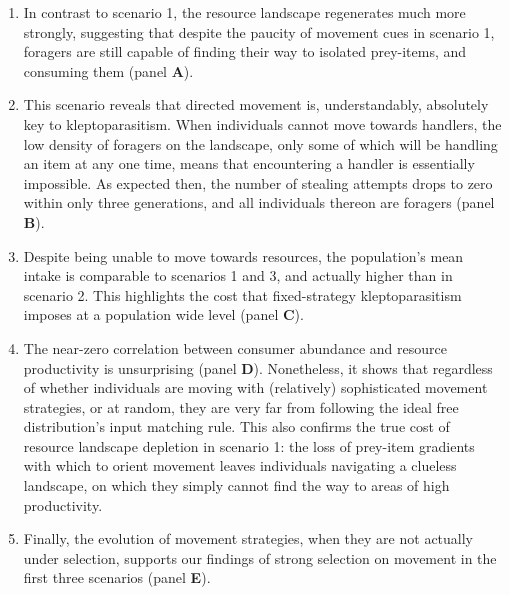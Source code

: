 \documentclass[]{scrartcl}
\begin{document}
\begin{enumerate}
\def\labelenumi{\arabic{enumi}.}
\item
  In contrast to scenario 1, the resource landscape regenerates much more strongly, suggesting that despite the paucity of movement cues in scenario 1, foragers are still capable of finding their way to isolated prey-items, and consuming them (panel \textbf{A}).
\item
  This scenario reveals that directed movement is, understandably, absolutely key to kleptoparasitism.
  When individuals cannot move towards handlers, the low density of foragers on the landscape, only some of which will be handling an item at any one time, means that encountering a handler is essentially impossible.
  As expected then, the number of stealing attempts drops to zero within only three generations, and all individuals thereon are foragers (panel \textbf{B}).
\item
  Despite being unable to move towards resources, the population's mean intake is comparable to scenarios 1 and 3, and actually higher than in scenario 2.
  This highlights the cost that fixed-strategy kleptoparasitism imposes at a population wide level (panel \textbf{C}).
\item
  The near-zero correlation between consumer abundance and resource productivity is unsurprising (panel \textbf{D}).
  Nonetheless, it shows that regardless of whether individuals are moving with (relatively) sophisticated movement strategies, or at random, they are very far from following the ideal free distribution's input matching rule.
  This also confirms the true cost of resource landscape depletion in scenario 1: the loss of prey-item gradients with which to orient movement leaves individuals navigating a clueless landscape, on which they simply cannot find the way to areas of high productivity.
\item
  Finally, the evolution of movement strategies, when they are not actually under selection, supports our findings of strong selection on movement in the first three scenarios (panel \textbf{E}).
\end{enumerate}
\end{document}
